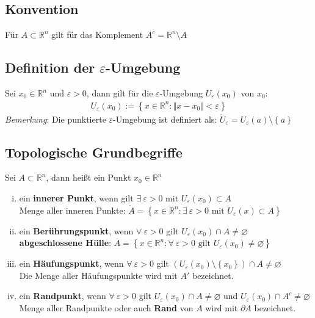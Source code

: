 \documentclass[11pt,a4paper]{book}
\newcommand {\Rn}	{\mathbb{R}^n}
\newcommand{\1}    	{\mathbbm{1}}
\begin{document}
\subsection{Konvention}
Für \(A \subset \Rn\) gilt für das Komplement \(A^c = \Rn \setminus A\)

\subsection{Definition der \(\varepsilon\)-Umgebung}
Sei \(x_0 \in \Rn\) und \(\varepsilon > 0\), dann gilt für die \(\varepsilon\)-Umgebung \(U_\varepsilon(x_0)\) von \(x_0\):
\begin{align*}
	U_\varepsilon(x_0) := \left\{ x \in \Rn : \Vert x - x_0 \Vert < \varepsilon \right\}
\end{align*}
\textit{Bemerkung}: Die punktierte \(\varepsilon\)-Umgebung ist definiert als: \( \dot{U}_\varepsilon = U_\varepsilon (a) \setminus \left\{ a \right\} \)

\subsection{Topologische Grundbegriffe}
Sei \(A \subset \Rn\), dann heißt ein Punkt \(x_0 \in \Rn\)
\begin{enumerate}[(i)]
	\item ein \textbf{innerer Punkt}, wenn gilt \(\exists~ \varepsilon > 0\) mit \(U_\varepsilon(x_0) \subset A\) \\
	Menge aller inneren Punkte: \( \mathring{A} = \left\{ x \in \Rn : \exists~ \varepsilon > 0 \textrm{ mit } U_\varepsilon(x) \subset A \right\} \)
	\item ein \textbf{Berührungspunkt}, wenn \(\forall~ \varepsilon > 0\) gilt \(U_\varepsilon (x_0) \cap A \neq \varnothing \) \\
	\textbf{abgeschlossene Hülle}: \(\overline{A} = \left\{ x \in \Rn : \forall~ \varepsilon > 0 \textrm{ gilt } U_\varepsilon(x_0) \neq \varnothing \right\} \)
	\item ein \textbf{Häufungspunkt}, wenn \(\forall~ \varepsilon > 0\) gilt \( \left( U_\varepsilon(x_0) \setminus \left\{ x_0 \right\} \right) \cap A \neq \varnothing \) \\
	Die Menge aller Häufungspunkte wird mit \(A'\) bezeichnet.
	\item ein \textbf{Randpunkt}, wenn \(\forall~ \varepsilon > 0\) gilt \( U_\varepsilon(x_0) \cap A \neq \varnothing\) und \( U_\varepsilon(x_0) \cap A^c \neq \varnothing\) \\
	Menge aller Randpunkte oder auch \textbf{Rand} von \(A\) wird mit \(\partial A \) bezeichnet.
\end{enumerate}
\end{document}
